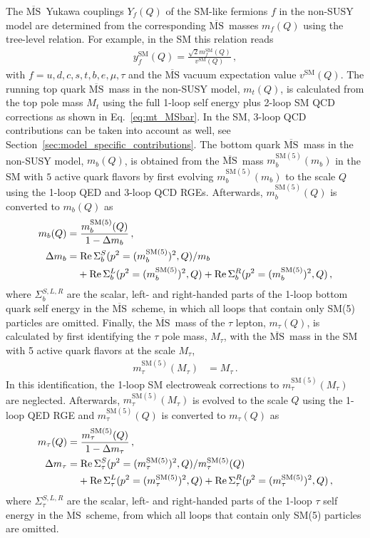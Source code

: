 \documentclass[final,3p,11pt,pdflatex]{elsarticle}
\newcommand{\ol}[1]{\overline{#1}}
\newcommand{\MSbar}{\ensuremath{\ol{\text{MS}}}\xspace}
\newcommand{\SM}{\ensuremath{\text{SM}}\xspace}
\newcommand{\secref}[1]{Section~\ref{#1}}
\DeclareMathOperator{\re}{Re}
\begin{document}
The \MSbar\ Yukawa couplings $Y_f(Q)$ of the SM-like
fermions $f$ in the non-SUSY model are determined from the
corresponding \MSbar\ masses $m_f(Q)$ using the tree-level
relation. For example, in the SM this relation reads
%
\begin{align}
  y_f^{\SM}(Q) = \frac{\sqrt{2} m_f^{\SM}(Q)}{v^{\SM}(Q)} \,,
\end{align}
%
with $f = u,d,c,s,t,b,e,\mu,\tau$ and the \MSbar vacuum expectation value $v^{\SM}(Q)$.
The running top quark \MSbar\ mass in the non-SUSY model, $m_t(Q)$, is
calculated from the top pole mass $M_t$
using the full 1-loop self energy plus 2-loop SM QCD
corrections as shown in Eq.\ \eqref{eq:mt_MSbar}.
In the SM, 3-loop QCD contributions can be taken into
account as well, see \secref{sec:model_specific_contributions}.
%
The bottom quark \MSbar\ mass in the non-SUSY model, $m_b(Q)$, is
obtained from the \MSbar\ mass $m_b^{\SM(5)}(m_b)$ in the SM with $5$ active quark flavors by first evolving
$m_b^{\SM(5)}(m_b)$ to the scale $Q$ using the 1-loop QED and 3-loop
QCD RGEs.  Afterwards, $m_b^{\SM(5)}(Q)$ is converted to $m_b(Q)$ as
%
\begin{align}
  m_b(Q) &= \frac{m_b^{\SM(5)}(Q)}{1 - \Delta m_b} \,, \\
  \Delta m_b &= \re\Sigma_{b}^S(p^2=(m_b^{\SM(5)})^2,Q)/m_b \notag\\
  &\phantom{={}}+ \re\Sigma_{b}^L(p^2=(m_b^{\SM(5)})^2,Q)
  + \re\Sigma_{b}^R(p^2=(m_b^{\SM(5)})^2,Q) \,,
  \label{eq:bottom-conversion}
\end{align}
%
where $\Sigma_{b}^{S,L,R}$ are the scalar, left- and right-handed
parts of the 1-loop bottom quark self energy in the \MSbar\ scheme, in
which all loops that contain only SM(5) particles are omitted.  Finally, the
\MSbar\ mass of the $\tau$ lepton, $m_\tau(Q)$, is calculated by first
identifying the $\tau$ pole mass, $M_\tau$, with the \MSbar\ mass in
the SM with 5 active quark flavors at the scale $M_\tau$,
%
\begin{align}
  m_\tau^{\SM(5)}(M_\tau) &=  M_\tau \,.
\end{align}
%
In this identification, the 1-loop SM electroweak
corrections to $m_\tau^{\SM(5)}(M_\tau)$ are neglected.  Afterwards,
$m_\tau^{\SM(5)}(M_\tau)$ is evolved to the scale $Q$ using the 1-loop QED RGE
and $m_\tau^{\SM(5)}(Q)$ is converted to $m_\tau(Q)$ as
%
\begin{align}
  m_\tau(Q) &= \frac{m_\tau^{\SM(5)}(Q)}{1 - \Delta m_\tau} \,, \\
  \Delta m_\tau &=
  \re\Sigma_{\tau}^S(p^2=(m_\tau^{\SM(5)})^2,Q) / m_\tau^{\SM(5)}(Q) \notag \\
  &\phantom{={}}
  + \re\Sigma_{\tau}^L(p^2=(m_\tau^{\SM(5)})^2,Q)
    + \re\Sigma_{\tau}^R(p^2=(m_\tau^{\SM(5)})^2,Q) \,,
\end{align}
%
where $\Sigma_{\tau}^{S,L,R}$ are the scalar, left- and right-handed
parts of the 1-loop $\tau$ self energy in the \MSbar\ scheme,
from which all loops that contain only SM(5) particles are omitted.
\end{document}
